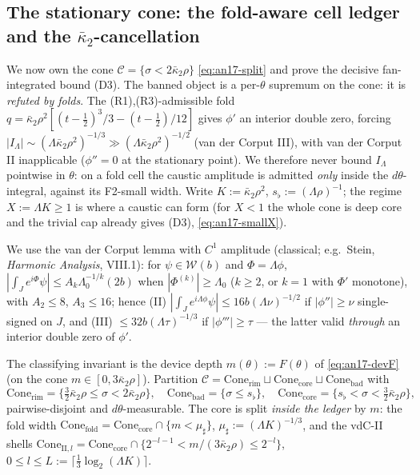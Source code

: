 \subsection{The stationary cone: the fold-aware cell ledger and the
$\bar\kappa_2$-cancellation}
\label{sec:an17-cone}

We now own the cone $\mathcal C=\{\sigma<2\bar\kappa_2\rho\}$
\eqref{eq:an17-split} and prove the decisive fan-integrated bound (D3). The banned
object is a per-$\theta$ supremum on the cone: it is \emph{refuted by folds}. The
(R1),(R3)-admissible fold
$q=\bar\kappa_2\rho^2[(t-\tfrac12)^3/3-(t-\tfrac12)/12]$ gives $\phi'$ an interior
double zero, forcing $|I_\Lambda|\sim(\Lambda\bar\kappa_2\rho^2)^{-1/3}\gg
(\Lambda\bar\kappa_2\rho^2)^{-1/2}$ (van der Corput III), with van der Corput II
inapplicable ($\phi''=0$ at the stationary point). We therefore never bound
$I_\Lambda$ pointwise in $\theta$: on a fold cell the caustic amplitude is admitted
\emph{only} inside the $d\theta$-integral, against its F2-small width. Write
$K:=\bar\kappa_2\rho^2$, $s_\flat:=(\Lambda\rho)^{-1}$; the regime $X:=\Lambda K\ge1$
is where a caustic can form (for $X<1$ the whole cone is deep core and the trivial
cap already gives (D3), \eqref{eq:an17-smallX}).

We use the van der Corput lemma with $C^1$ amplitude (classical; e.g.\ Stein,
\emph{Harmonic Analysis}, VIII.1): for $\psi\in\mathcal W(b)$ and
$\Phi=\Lambda\phi$, $|\int_J e^{i\Phi}\psi|\le A_k\Lambda_0^{-1/k}(2b)$ when
$|\Phi^{(k)}|\ge\Lambda_0$ ($k\ge2$, or $k=1$ with $\Phi'$ monotone), with
$A_2\le8$, $A_3\le16$; hence (II) $|\int_J e^{i\Lambda\phi}\psi|\le16b(\Lambda
\nu)^{-1/2}$ if $|\phi''|\ge\nu$ single-signed on $J$, and (III) $\le32b(\Lambda
\tau)^{-1/3}$ if $|\phi'''|\ge\tau$ --- the latter valid \emph{through} an interior
double zero of $\phi'$.

\begin{definition}
\label{an17:def-cellpart}
The classifying invariant is the device depth $m(\theta):=F(\theta)$ of
\eqref{eq:an17-devF} (on the cone $m\in[0,3\bar\kappa_2\rho]$). Partition
$\mathcal C=\mathrm{Cone}_{\mathrm{rim}}\sqcup\mathrm{Cone}_{\mathrm{core}}\sqcup
\mathrm{Cone}_{\mathrm{bad}}$ with
\[
 \mathrm{Cone}_{\mathrm{rim}}=\{\tfrac32\bar\kappa_2\rho\le\sigma<2\bar\kappa_2\rho\},
 \quad
 \mathrm{Cone}_{\mathrm{bad}}=\{\sigma\le s_\flat\},
 \quad
 \mathrm{Cone}_{\mathrm{core}}=\{s_\flat<\sigma<\tfrac32\bar\kappa_2\rho\},
\]
pairwise-disjoint and $d\theta$-measurable. The core is split \emph{inside the
ledger} by $m$: the fold width $\mathrm{Cone}_{\mathrm{fold}}=\mathrm{Cone}_
{\mathrm{core}}\cap\{m<\mu_\sharp\}$, $\mu_\sharp:=(\Lambda K)^{-1/3}$, and the
vdC-II shells $\mathrm{Cone}_{\mathrm{II},l}=\mathrm{Cone}_{\mathrm{core}}\cap
\{2^{-l-1}<m/(3\bar\kappa_2\rho)\le2^{-l}\}$, $0\le l\le L:=
\lceil\tfrac13\log_2(\Lambda K)\rceil$.
\end{definition}

